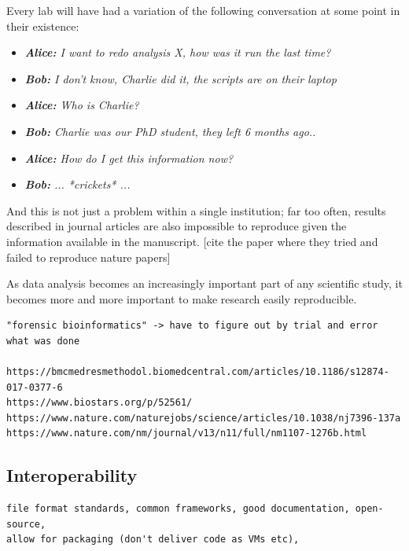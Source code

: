 Every lab will have had a variation of the following conversation at some point in their existence:

\begin{itemize}
\itemsep-0.5em
\item \textit{\textbf{Alice:} I want to redo analysis X, how was it run the last time?} \\
\item \textit{\textbf{Bob:} I don't know, Charlie did it, the scripts are on their laptop} \\
\item \textit{\textbf{Alice:} Who is Charlie?} \\
\item \textit{\textbf{Bob:} Charlie was our PhD student, they left 6 months ago..} \\
\item \textit{\textbf{Alice:} How do I get this information now?} \\
\item \textit{\textbf{Bob:} ... *crickets* ...}
\end{itemize}


And this is not just a problem within a single institution; far too often, results described in journal articles are also impossible to reproduce given the information available in the manuscript. [cite the paper where they tried and failed to reproduce nature papers]

As data analysis becomes an increasingly important part of any scientific study, it becomes more and more important to make research easily reproducible.


\begin{verbatim}
"forensic bioinformatics" -> have to figure out by trial and error what was done

https://bmcmedresmethodol.biomedcentral.com/articles/10.1186/s12874-017-0377-6
https://www.biostars.org/p/52561/
https://www.nature.com/naturejobs/science/articles/10.1038/nj7396-137a
https://www.nature.com/nm/journal/v13/n11/full/nm1107-1276b.html

\end{verbatim}

\subsection{Interoperability}
\begin{verbatim}
file format standards, common frameworks, good documentation, open-source,
allow for packaging (don't deliver code as VMs etc),
\end{verbatim}

